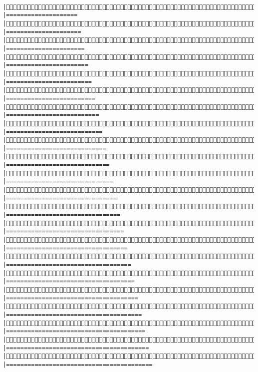\documentclass[]{article}
\begin{document}
\begin{verbatim}
    |Simulating: |====================                                         |Simulating: |=====================                                        |Simulating: |======================                                       |Simulating: |=======================                                      |Simulating: |========================                                     |Simulating: |=========================                                    |Simulating: |==========================                                   |Simulating: |===========================                                  |Simulating: |============================                                 |Simulating: |=============================                                |Simulating: |==============================                               |Simulating: |===============================                              |Simulating: |================================                             |Simulating: |=================================                            |Simulating: |==================================                           |Simulating: |===================================                          |Simulating: |====================================                         |Simulating: |=====================================                        |Simulating: |======================================                       |Simulating: |=======================================                      |Simulating: |========================================                     |Simulating: |=========================================                    
\end{verbatim}
\end{document}
